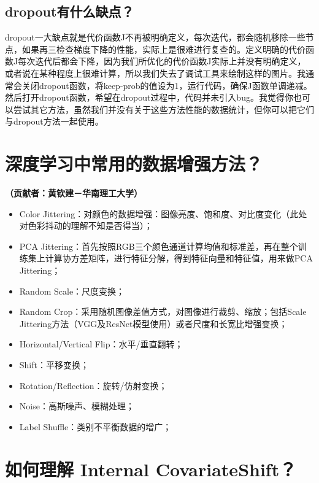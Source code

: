 \subsection{dropout有什么缺点？}\label{dropoutux6709ux4ec0ux4e48ux7f3aux70b9}

​
dropout一大缺点就是代价函数J不再被明确定义，每次迭代，都会随机移除一些节点，如果再三检查梯度下降的性能，实际上是很难进行复查的。定义明确的代价函数J每次迭代后都会下降，因为我们所优化的代价函数J实际上并没有明确定义，或者说在某种程度上很难计算，所以我们失去了调试工具来绘制这样的图片。我通常会关闭dropout函数，将keep-prob的值设为1，运行代码，确保J函数单调递减。然后打开dropout函数，希望在dropout过程中，代码并未引入bug。我觉得你也可以尝试其它方法，虽然我们并没有关于这些方法性能的数据统计，但你可以把它们与dropout方法一起使用。

\section{深度学习中常用的数据增强方法？}\label{ux6df1ux5ea6ux5b66ux4e60ux4e2dux5e38ux7528ux7684ux6570ux636eux589eux5f3aux65b9ux6cd5}

\textbf{（贡献者：黄钦建－华南理工大学）}

\begin{itemize}
\item
  Color
  Jittering：对颜色的数据增强：图像亮度、饱和度、对比度变化（此处对色彩抖动的理解不知是否得当）；
\item
  PCA
  Jittering：首先按照RGB三个颜色通道计算均值和标准差，再在整个训练集上计算协方差矩阵，进行特征分解，得到特征向量和特征值，用来做PCA
  Jittering；
\item
  Random Scale：尺度变换；
\item
  Random Crop：采用随机图像差值方式，对图像进行裁剪、缩放；包括Scale
  Jittering方法（VGG及ResNet模型使用）或者尺度和长宽比增强变换；
\item
  Horizontal/Vertical Flip：水平/垂直翻转；
\item
  Shift：平移变换；
\item
  Rotation/Reflection：旋转/仿射变换；
\item
  Noise：高斯噪声、模糊处理；
\item
  Label Shuffle：类别不平衡数据的增广；
\end{itemize}

\section{如何理解 Internal CovariateShift？}\label{ux5982ux4f55ux7406ux89e3-internal-covariate-shift}

